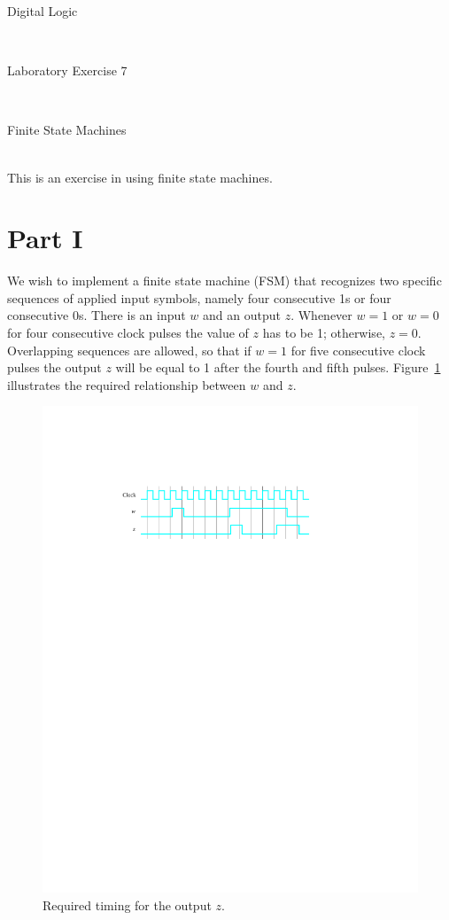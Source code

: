 \documentclass[epsfig,10pt,fullpage]{article}
\newcommand{\LabNum}{7}
\begin{document}
\centerline{\huge Digital Logic}
~\\
\centerline{\huge Laboratory Exercise \LabNum}
~\\
\centerline{\large Finite State Machines}
~\\

\noindent
This is an exercise in using finite state machines.
~\\

\section*{Part I}
We wish to implement a finite state machine (FSM) that recognizes two specific sequences 
of applied input symbols, namely four consecutive 1s or four consecutive 0s. There is an 
input $w$ and an output $z$. Whenever $w = 1$
or $w = 0$ for four consecutive clock pulses the value of $z$ has to be 1; 
otherwise, $z = 0$. Overlapping sequences
are allowed, so that if $w = 1$ for five consecutive clock pulses the output $z$
will be equal to 1 after the fourth and
fifth pulses. Figure~\ref{fig:sequence_diagram} illustrates the required relationship between $w$ and $z$.

\begin{figure}[H]
\centerline{
\includegraphics{figures/figure1.pdf}}
\caption{Required timing for the output $z$.}
\label{fig:sequence_diagram}
\end{figure}
\end{document}
